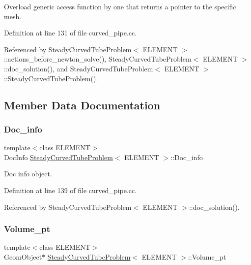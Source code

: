 Overload generic access function by one that returns a pointer to the specific mesh. 



Definition at line 131 of file curved\+\_\+pipe.\+cc.



Referenced by Steady\+Curved\+Tube\+Problem$<$ E\+L\+E\+M\+E\+N\+T $>$\+::actions\+\_\+before\+\_\+newton\+\_\+solve(), Steady\+Curved\+Tube\+Problem$<$ E\+L\+E\+M\+E\+N\+T $>$\+::doc\+\_\+solution(), and Steady\+Curved\+Tube\+Problem$<$ E\+L\+E\+M\+E\+N\+T $>$\+::\+Steady\+Curved\+Tube\+Problem().



\subsection{Member Data Documentation}
\mbox{\label{classSteadyCurvedTubeProblem_a1a48437e34e38bf6d96aef540fda70b6}} 
\subsubsection{\texorpdfstring{Doc\+\_\+info}{Doc\_info}}
{\footnotesize\ttfamily template$<$class E\+L\+E\+M\+E\+NT$>$ \\
Doc\+Info \hyperlink{classSteadyCurvedTubeProblem}{Steady\+Curved\+Tube\+Problem}$<$ E\+L\+E\+M\+E\+NT $>$\+::Doc\+\_\+info\hspace{0.3cm}{\ttfamily [private]}}



Doc info object. 



Definition at line 139 of file curved\+\_\+pipe.\+cc.



Referenced by Steady\+Curved\+Tube\+Problem$<$ E\+L\+E\+M\+E\+N\+T $>$\+::doc\+\_\+solution().

\mbox{\label{classSteadyCurvedTubeProblem_a06fa168a75e0ce3b0cd0eccacf226a6c}} 
\subsubsection{\texorpdfstring{Volume\+\_\+pt}{Volume\_pt}}
{\footnotesize\ttfamily template$<$class E\+L\+E\+M\+E\+NT$>$ \\
Geom\+Object$\ast$ \hyperlink{classSteadyCurvedTubeProblem}{Steady\+Curved\+Tube\+Problem}$<$ E\+L\+E\+M\+E\+NT $>$\+::Volume\+\_\+pt\hspace{0.3cm}{\ttfamily [private]}}



